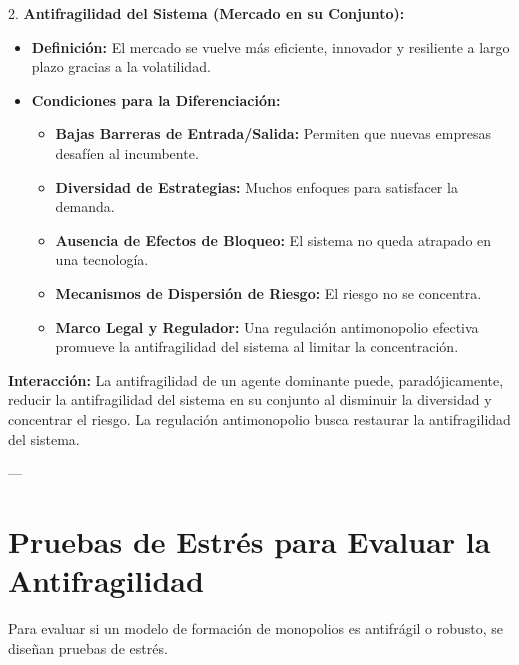 \documentclass{article}
\begin{document}
2.  \textbf{Antifragilidad del Sistema (Mercado en su Conjunto):}
    \begin{itemize}
        \item \textbf{Definición:} El mercado se vuelve más eficiente, innovador y resiliente a largo plazo gracias a la volatilidad.
        \item \textbf{Condiciones para la Diferenciación:}
            \begin{itemize}
                \item \textbf{Bajas Barreras de Entrada/Salida:} Permiten que nuevas empresas desafíen al incumbente.
                \item \textbf{Diversidad de Estrategias:} Muchos enfoques para satisfacer la demanda.
                \item \textbf{Ausencia de Efectos de Bloqueo:} El sistema no queda atrapado en una tecnología.
                \item \textbf{Mecanismos de Dispersión de Riesgo:} El riesgo no se concentra.
                \item \textbf{Marco Legal y Regulador:} Una regulación antimonopolio efectiva promueve la antifragilidad del sistema al limitar la concentración.
            \end{itemize}
    \end{itemize}
\textbf{Interacción:} La antifragilidad de un agente dominante puede, paradójicamente, reducir la antifragilidad del sistema en su conjunto al disminuir la diversidad y concentrar el riesgo. La regulación antimonopolio busca restaurar la antifragilidad del sistema.

---

\section{Pruebas de Estrés para Evaluar la Antifragilidad}

Para evaluar si un modelo de formación de monopolios es antifrágil o robusto, se diseñan pruebas de estrés.
\end{document}
